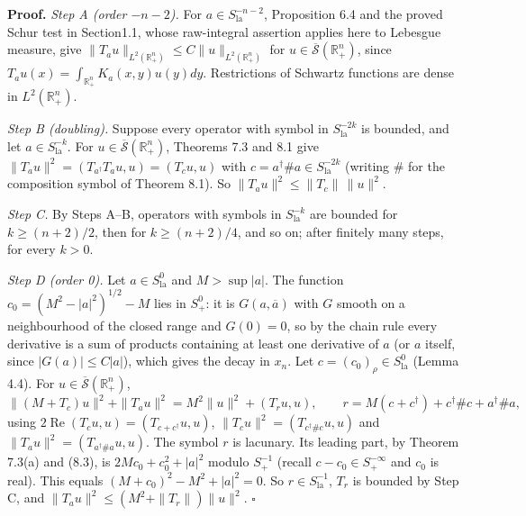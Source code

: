 \documentclass[
  11pt,
]{article}
\begin{document}
\textbf{Proof.} \emph{Step A (order \(-n-2\)).} For
\(a\in S^{-n-2}_{\mathrm{la}}\), Proposition 6.4 and the proved Schur
test in Section1.1, whose raw-integral assertion applies here to
Lebesgue measure, give
\(\|T_au\|_{L^2(\mathbb R^n_+)}\leq C\|u\|_{L^2(\mathbb R^n_+)}\) for
\(u\in\overline{\mathcal S}(\mathbb R^n_+)\), since
\(T_au(x)=\int_{\mathbb R^n_+}K_a(x,y)u(y)dy\). Restrictions of Schwartz
functions are dense in \(L^2(\mathbb R^n_+)\).

\emph{Step B (doubling).} Suppose every operator with symbol in
\(S^{-2k}_{\mathrm{la}}\) is bounded, and let
\(a\in S^{-k}_{\mathrm{la}}\). For
\(u\in\overline{\mathcal S}(\mathbb R^n_+)\), Theorems 7.3 and 8.1 give
\(\|T_au\|^2=(T_{a^\dagger}T_au,u)=(T_cu,u)\) with
\(c=a^\dagger\#a\in S^{-2k}_{\mathrm{la}}\) (writing \(\#\) for the
composition symbol of Theorem 8.1). So
\(\|T_au\|^2\leq\|T_c\|\,\|u\|^2\).

\emph{Step C.} By Steps A--B, operators with symbols in
\(S^{-k}_{\mathrm{la}}\) are bounded for \(k\geq(n+2)/2\), then for
\(k\geq(n+2)/4\), and so on; after finitely many steps, for every
\(k>0\).

\emph{Step D (order 0).} Let \(a\in S^0_{\mathrm{la}}\) and
\(M>\sup|a|\). The function \(c_0=(M^2-|a|^2)^{1/2}-M\) lies in
\(S^0_+\): it is \(G(a,\overline a)\) with \(G\) smooth on a
neighbourhood of the closed range and \(G(0)=0\), so by the chain rule
every derivative is a sum of products containing at least one derivative
of \(a\) (or \(a\) itself, since \(|G(a)|\leq C|a|\)), which gives the
decay in \(x_n\). Let \(c=(c_0)_\rho\in S^0_{\mathrm{la}}\) (Lemma 4.4).
For \(u\in\overline{\mathcal S}(\mathbb R^n_+)\), \[
\|(M+T_c)u\|^2+\|T_au\|^2=M^2\|u\|^2+(T_ru,u),\qquad r=M(c+c^\dagger)+c^\dagger\#c+a^\dagger\#a,
\] using \(2\operatorname{Re}(T_cu,u)=(T_{c+c^\dagger}u,u)\),
\(\|T_cu\|^2=(T_{c^\dagger\#c}u,u)\) and
\(\|T_au\|^2=(T_{a^\dagger\#a}u,u)\). The symbol \(r\) is lacunary. Its
leading part, by Theorem 7.3(a) and (8.3), is \(2Mc_0+c_0^2+|a|^2\)
modulo \(S^{-1}_+\) (recall \(c-c_0\in S^{-\infty}_+\) and \(c_0\) is
real). This equals \((M+c_0)^2-M^2+|a|^2=0\). So
\(r\in S^{-1}_{\mathrm{la}}\), \(T_r\) is bounded by Step C, and
\(\|T_au\|^2\leq(M^2+\|T_r\|)\|u\|^2\). \(\square\)
\end{document}
